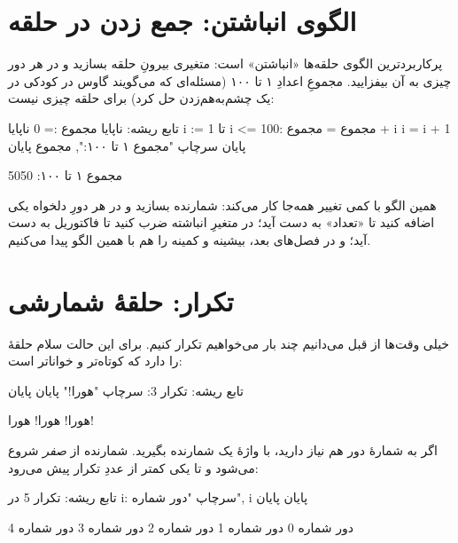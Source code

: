\section{الگوی انباشتن: جمع زدن در حلقه}

پرکاربردترین الگوی حلقه‌ها «انباشتن» است: متغیری بیرونِ حلقه بسازید و در هر
دور چیزی به آن بیفزایید. مجموعِ اعدادِ ۱ تا ۱۰۰ (مسئله‌ای که می‌گویند گاوس
در کودکی در یک چشم‌به‌هم‌زدن حل کرد) برای حلقه چیزی نیست:

\begin{salamfa}
تابع ریشه:
    ناپایا مجموع := 0
    ناپایا i := 1
    تا i <= 100:
        مجموع = مجموع + i
        i = i + 1
    پایان
    سرچاپ "مجموع ۱ تا ۱۰۰:", مجموع
پایان
\end{salamfa}

\begin{progoutfa}
مجموع ۱ تا ۱۰۰: 5050
\end{progoutfa}

همین الگو با کمی تغییر همه‌جا کار می‌کند: شمارنده بسازید و در هر دورِ
دلخواه یکی اضافه کنید تا «تعداد» به دست آید؛ در متغیرِ انباشته ضرب کنید تا
فاکتوریل به دست آید؛ و در فصل‌های بعد، بیشینه و کمینه را هم با همین الگو
پیدا می‌کنیم.

\section{تکرار: حلقهٔ شمارشی}

خیلی وقت‌ها از قبل می‌دانیم چند بار می‌خواهیم تکرار کنیم. برای این حالت
سلام حلقهٔ  را دارد که کوتاه‌تر و خواناتر است:

\begin{salamfa}
تابع ریشه:
    تکرار 3:
        سرچاپ "هورا!"
    پایان
پایان
\end{salamfa}

\begin{progoutfa}
هورا!
هورا!
هورا!
\end{progoutfa}

اگر به شمارهٔ دور هم نیاز دارید، با واژهٔ  یک شمارنده بگیرید.
شمارنده از \emph{صفر} شروع می‌شود و تا یکی کمتر از عددِ تکرار پیش می‌رود:

\begin{salamfa}
تابع ریشه:
    تکرار 5 در i:
        سرچاپ "دور شماره", i
    پایان
پایان
\end{salamfa}

\begin{progoutfa}
دور شماره 0
دور شماره 1
دور شماره 2
دور شماره 3
دور شماره 4
\end{progoutfa}

